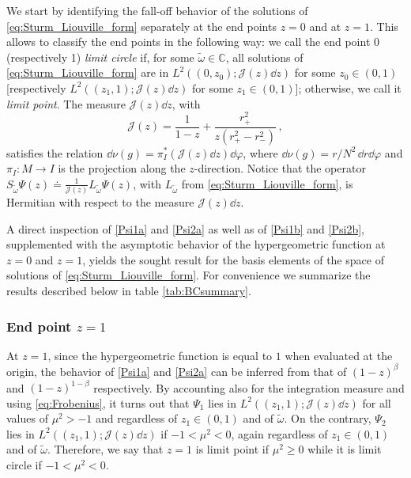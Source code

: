 \documentclass[aps, prd, amsmath, floats, floatfix, twocolumn, nofootinbib, superscriptaddress, showpacs]{revtex4-1}
\def\bC{{\mathbb C}}
\def\tomega{{\tilde{\omega}}}
\begin{document}
We start by identifying the fall-off behavior of the solutions of \eqref{eq:Sturm_Liouville_form} separately at the end points $z=0$ and at $z=1$. This allows to classify the end points in the following way: we call the end point 0 (respectively 1) \emph{limit circle} if, for some $\tilde{\omega} \in \bC$, all solutions of \eqref{eq:Sturm_Liouville_form} are in $L^2((0,z_0);\mathcal{J}(z)\dd z)$ for some $z_0 \in (0,1)$ [respectively $L^2((z_1,1);\mathcal{J}(z)\dd z)$ for some $z_1 \in (0,1)$]; otherwise, we call it \emph{limit point}. The measure $\mathcal{J}(z)\dd z$, with
%
\begin{equation} \label{eq:measure}
\mathcal{J}(z) = \frac{1}{1-z}+\frac{r^2_+}{z(r^2_+-r^2_-)} \, ,
\end{equation}
%
satisfies the relation $\dd\nu(g)=\pi_I^*(\mathcal{J}(z)\dd z) \dd \varphi$, where $\dd \nu(g) = r/N^2 \, \dd r \dd\varphi$ and $\pi_I:M\to I$ is the projection along the $z$-direction. Notice that the operator $S_\tomega\Psi(z) \doteq \frac{1}{\mathcal{J}(z)} L_\tomega\Psi(z)$, with $L_\tomega$ from \eqref{eq:Sturm_Liouville_form}, is Hermitian with respect to the measure $\mathcal{J}(z)\dd z$.

A direct inspection of \eqref{Psi1a} and \eqref{Psi2a} as well as of \eqref{Psi1b} and \eqref{Psi2b}, supplemented with the asymptotic behavior of the hypergeometric function at $z=0$ and $z=1$, yields the sought result for the basis elements of the space of solutions of \eqref{eq:Sturm_Liouville_form}. For convenience we summarize the results described below in table \ref{tab:BCsummary}.




\subsubsection{End point $z=1$}

	At $z=1$, since the hypergeometric function is equal to $1$ when evaluated at the origin, the behavior of \eqref{Psi1a} and \eqref{Psi2a} can be inferred from that of $(1-z)^\beta$ and $(1-z)^{1-\beta}$ respectively. By accounting also for the integration measure and using \eqref{eq:Frobenius}, it turns out that $\Psi_1$ lies in $L^2((z_1,1);\mathcal{J}(z)\dd z)$ for all values of $\mu^2>-1$ and regardless of $z_1\in(0,1)$ and of $\tilde{\omega}$. On the contrary, $\Psi_2$ lies in $L^2((z_1,1);\mathcal{J}(z)\dd z)$ if $-1<\mu^2<0$, again regardless of $z_1\in(0,1)$ and of $\tilde{\omega}$. Therefore, we say that $z=1$ is limit point if $\mu^2\geqslant 0$ while it is limit circle if $-1<\mu^2<0$.
	
\end{document}

